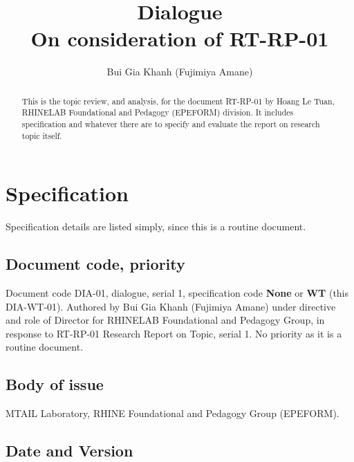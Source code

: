 \documentclass[10pt,a4paper]{article}
\title{\textbf{Dialogue} \\ On consideration of RT-RP-01} %
\author{Bui Gia Khanh (Fujimiya Amane)} %
\affiliation{} %
\begin{document}
\maketitle

\begin{abstract}
    \noindent
    This is the topic review, and analysis, for the document RT-RP-01 by Hoang Le Tuan, RHINELAB Foundational and Pedagogy (EPEFORM) division. It includes specification and whatever there are to specify and evaluate the report on research topic itself. 

\end{abstract}

\vspace{2.5cm}



\thispagestyle{firstpage}

\pagebreak


\newgeometry{} %

\section{Specification}
\label{sec:spec}

Specification details are listed simply, since this is a routine document. 

\subsection{Document code, priority}

Document code DIA-01, dialogue, serial 1, specification code \textbf{None} or \textbf{WT} (this DIA-WT-01). Authored by Bui Gia Khanh (Fujimiya Amane) under directive and role of Director for RHINELAB Foundational and Pedagogy Group, in response to RT-RP-01 Research Report on Topic, serial 1. No priority as it is a routine document. 


\subsection{Body of issue}

MTAIL Laboratory, RHINE Foundational and Pedagogy Group (EPEFORM). 


\subsection{Date and Version}
\end{document}
